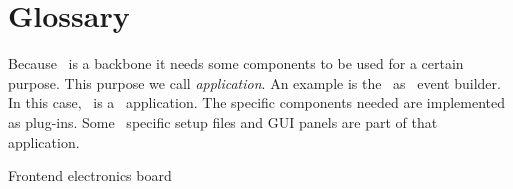 \chapter{Glossary}
\bdes
\item [Application] Because \dabc\ is a backbone it needs some components
to be used for a certain purpose. This purpose we call {\sl application}.
An example is the \dabc\ as \mbs\ event builder. In this case, \mbs\ is
a \dabc\ application. The specific components needed are implemented as plug-ins.
Some \mbs\ specific setup files and GUI panels are part of that application.
\item[FEE]Frontend electronics board
\edes
